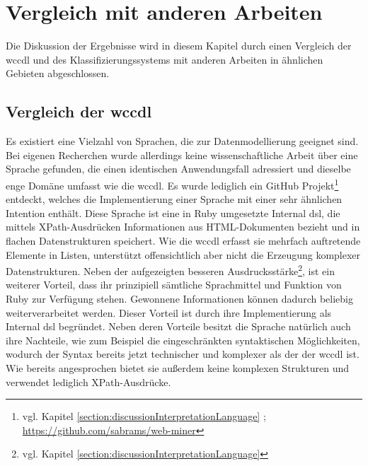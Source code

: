 \section{Vergleich mit anderen Arbeiten}
    Die Diskussion der Ergebnisse wird in diesem Kapitel
    durch einen Vergleich der \gls{wccdl} und des Klassifizierungssystems
    mit anderen Arbeiten in ähnlichen Gebieten abgeschlossen.

    \subsection{Vergleich der \acrshort{wccdl}}
        \label{section:discussionComparisonLanguage}
        Es existiert eine Vielzahl von Sprachen,
        die zur Datenmodellierung geeignet sind.
        Bei eigenen Recherchen wurde allerdings keine wissenschaftliche Arbeit über eine Sprache gefunden,
        die einen identischen Anwendungsfall adressiert und dieselbe enge Domäne umfasst wie die \gls{wccdl}.
        Es wurde lediglich ein
        GitHub Projekt\footnote{vgl. Kapitel \ref{section:discussionInterpretationLanguage} ; \url{https://github.com/sabrams/web-miner}} entdeckt,
        welches die Implementierung einer Sprache mit einer sehr ähnlichen Intention enthält.
        Diese Sprache ist eine in Ruby umgesetzte Internal \gls{dsl},
        die mittels XPath-Ausdrücken Informationen aus HTML-Dokumenten bezieht
        und in flachen Datenstrukturen speichert.
        Wie die \gls{wccdl} erfasst sie mehrfach auftretende Elemente in Listen,
        unterstützt offensichtlich aber nicht die Erzeugung komplexer Datenstrukturen.
        Neben der aufgezeigten besseren
        Ausdrucksstärke\footnote{vgl. Kapitel \ref{section:discussionInterpretationLanguage}},
        ist ein weiterer Vorteil,
        dass ihr prinzipiell sämtliche Sprachmittel und Funktion von Ruby
        zur Verfügung stehen.
        Gewonnene Informationen können dadurch beliebig weiterverarbeitet werden.
        Dieser Vorteil ist durch ihre Implementierung als Internal \gls{dsl} begründet.
        Neben deren Vorteile besitzt die Sprache natürlich auch ihre Nachteile,
        wie zum Beispiel die eingeschränkten syntaktischen Möglichkeiten,
        wodurch der Syntax bereits jetzt technischer und komplexer als der der \gls{wccdl} ist.
        Wie bereits angesprochen bietet sie außerdem keine komplexen Strukturen und verwendet lediglich XPath-Ausdrücke.

